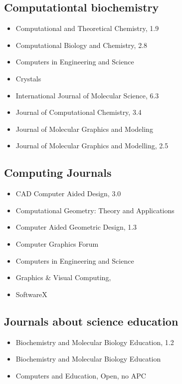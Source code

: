 \documentclass[10pt,letterpaper]{article}
\begin{document}
\subsection{Computationtal biochemistry}

\begin{itemize}
  \item Computational and Theoretical Chemistry, 1.9
  \item Computational Biology and Chemistry, 2.8 
  \item Computers in Engineering and Science
  \item Crystals
  \item International Journal of Molecular Science, 6.3
  \item Journal of Computational Chemistry, 3.4
  \item Journal of Molecular Graphics and Modeling
  \item Journal of Molecular Graphics and Modelling, 2.5
\end{itemize}


\subsection{Computing Journals}

\begin{itemize}
  \item CAD Computer Aided Design, 3.0    
  \item Computational Geometry: Theory and Applications  
  \item Computer Aided Geometric Design, 1.3
  \item Computer Graphics Forum
  \item Computers in Engineering and Science
  \item Graphics \& Visual Computing,
  \item SoftwareX
\end{itemize}


\subsection{Journals about science education}

\begin{itemize}
  \item Biochemistry and Molecular Biology Education, 1.2
  \item Biochemistry and Molecular Biology Education
  \item Computers and Education, Open, no APC  
\end{itemize}
\end{document}
